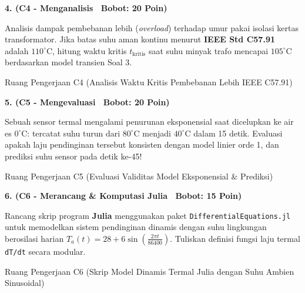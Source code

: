 \documentclass[10pt,a4paper]{article}
\begin{document}
\newpage

\noindent\textbf{4. (C4 - Menganalisis \textbar\ Bobot: 20 Poin)}\par\vspace{0.5mm}
{\footnotesize Analisis dampak pembebanan lebih (\textit{overload}) terhadap umur pakai isolasi kertas transformator. Jika batas suhu aman kontinu menurut \textbf{IEEE Std C57.91} adalah $110^\circ\text{C}$, hitung waktu kritis $t_{\text{kritis}}$ saat suhu minyak trafo mencapai $105^\circ\text{C}$ berdasarkan model transien Soal 3.}
\begin{answerbox}{Ruang Pengerjaan C4 (Analisis Waktu Kritis Pembebanan Lebih IEEE C57.91)}
  \vspace{3.8cm}
\end{answerbox}

\vspace{1.5mm}

\noindent\textbf{5. (C5 - Mengevaluasi \textbar\ Bobot: 20 Poin)}\par\vspace{0.5mm}
{\footnotesize Sebuah sensor termal mengalami penurunan eksponensial saat dicelupkan ke air es $0^\circ\text{C}$: tercatat suhu turun dari $80^\circ\text{C}$ menjadi $40^\circ\text{C}$ dalam 15 detik. Evaluasi apakah laju pendinginan tersebut konsisten dengan model linier orde 1, dan prediksi suhu sensor pada detik ke-45!}
\begin{answerbox}{Ruang Pengerjaan C5 (Evaluasi Validitas Model Eksponensial \& Prediksi)}
  \vspace{3.8cm}
\end{answerbox}

\vspace{1.5mm}

\noindent\textbf{6. (C6 - Merancang \& Komputasi Julia \textbar\ Bobot: 15 Poin)}\par\vspace{0.5mm}
{\footnotesize Rancang skrip program \textbf{Julia} menggunakan paket \texttt{Differential\-Equations.jl} untuk memodelkan sistem pendinginan dinamis dengan suhu lingkungan berosilasi harian $T_a(t) = 28 + 6\sin(\frac{2\pi t}{86400})$. Tuliskan definisi fungsi laju termal \texttt{dT/dt} secara modular.}
\begin{answerbox}{Ruang Pengerjaan C6 (Skrip Model Dinamis Termal Julia dengan Suhu Ambien Sinusoidal)}
  \vspace{3.8cm}
\end{answerbox}
\end{document}
